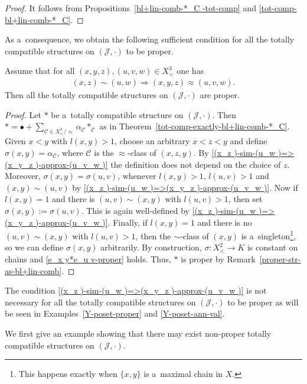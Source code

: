 \documentclass{jonasart}
\newcommand{\af}{\alpha}
\newcommand{\bl}{\bullet}
\newcommand{\C}{\mathcal{C}}
\newcommand{\impl}{\Rightarrow}
\newcommand{\J}{\mathcal{J}}
\newcommand{\sg}{\sigma}
\begin{document}
	\begin{proof}
		It follows from Propositions~\ref{bl+lin-comb-*_C -tot-comp} and \ref{tot-comp-bl+lin-comb-*_C}.
	\end{proof}

	As a~consequence, we obtain the following sufficient condition for all the totally compatible structures on $(\J,\cdot)$ to be proper.
	\begin{corollary}\label{suff-cond-all-tot-comp-are-proper}
		Assume that for all $(x,y,z),(u,v,w)\in X^3_<$ one has
		\begin{align}\label{(x_z )-sim-(u_w )=>(x_y_z )-approx-(u_v_w )}
			(x,z)\sim(u,w)\impl(x,y,z)\approx(u,v,w).
		\end{align}
		Then all the totally compatible structures on $(\J,\cdot)$ are proper.
	\end{corollary}

	\begin{proof}
		Let $*$ be a~totally compatible structure on $(\J,\cdot)$. Then $*=\bl+\sum_{\C\in X^3_< /{\approx}}\af_\C*_\C$ as in Theorem~\ref{tot-comp-exactly-bl+lin-comb-*_C}. Given $x<y$ with $l(x,y)>1$, choose an arbitrary $x<z<y$ and define $\sg(x,y)=\af_\C$, where $\C$ is the $\approx$-class of $(x,z,y)$. By \eqref{(x_z )-sim-(u_w )=>(x_y_z )-approx-(u_v_w )} the definition does not depend on the choice of $z$. Moreover, $\sg(x,y)=\sg(u,v)$, whenever $l(x,y)>1$, $l(u,v)>1$ and $(x,y)\sim(u,v)$ by \eqref{(x_z )-sim-(u_w )=>(x_y_z )-approx-(u_v_w )}. Now if $l(x,y)=1$ and there is $(u,v)\sim(x,y)$ with $l(u,v)>1$, then set $\sg(x,y):=\sg(u,v)$. This is again well-defined by \eqref{(x_z )-sim-(u_w )=>(x_y_z )-approx-(u_v_w )}. Finally, if $l(x,y)=1$ and there is no $(u,v)\sim(x,y)$ with $l(u,v)>1$, then the $\sim$-class of $(x,y)$ is a~singleton\footnote{This happens exactly when $\{x,y\}$ is a~maximal chain in $X$.}, so we can define $\sg(x,y)$ arbitrarily. By construction, $\sg:X^2_<\to K$ is constant on chains and \eqref{e_x y*e_u v-proper} holds. Thus, $*$ is proper by Remark~\ref{proper-str-as-bl+lin-comb}.
	\end{proof}

	\begin{remark}
		The condition \eqref{(x_z )-sim-(u_w )=>(x_y_z )-approx-(u_v_w )} is not necessary for all the totally compatible structures on $(\J,\cdot)$ to be proper as will be seen in Examples~\ref{Y-poset-proper} and \ref{Y-poset-ann-val}.
	\end{remark}

	We first give an example showing that there may exist non-proper totally compatible structures on $(\J,\cdot)$.
\end{document}

